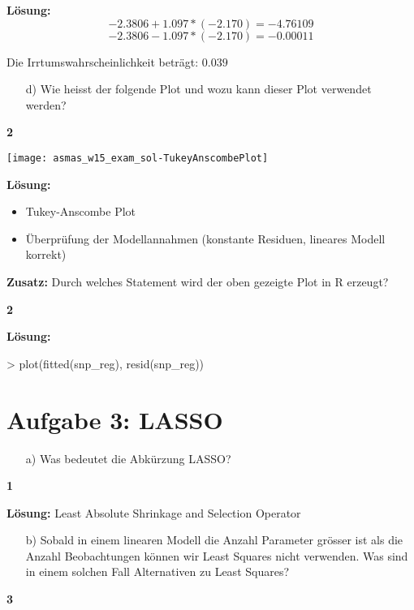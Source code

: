 \documentclass{scrartcl}
\newcommand{\points}[1]
{\begin{flushright}\textbf{#1}\end{flushright}}
\begin{document}
\noindent\textbf{L\"osung:}
$$-2.3806 + 1.097 * (-2.170) = -4.76109$$
$$-2.3806 - 1.097 * (-2.170) = -0.00011$$

Die Irrtumswahrscheinlichkeit betr\"agt: $0.039$

\clearpage
\pagebreak

\begin{enumerate}
\item[d)] Wie heisst der folgende Plot und wozu kann dieser Plot verwendet werden?
\end{enumerate}
\points{2}

\texttt{[image: asmas\_w15\_exam\_sol-TukeyAnscombePlot]}


\noindent\textbf{L\"osung:}
\begin{itemize}
\item Tukey-Anscombe Plot
\item \"Uberpr\"ufung der Modellannahmen (konstante Residuen, lineares Modell korrekt)
\end{itemize}


\clearpage
\pagebreak

\noindent\textbf{Zusatz:} Durch welches Statement wird der oben gezeigte Plot in R erzeugt?

\points{2}

\noindent\textbf{L\"osung:}
\begin{Schunk}
\begin{Sinput}
> plot(fitted(snp_reg), resid(snp_reg))
\end{Sinput}
\end{Schunk}


\clearpage
\pagebreak

\section*{Aufgabe 3: LASSO}

\begin{enumerate}
\item[a)] Was bedeutet die Abk\"urzung LASSO?
\end{enumerate}
\points{1}

\noindent\textbf{L\"osung:} Least Absolute Shrinkage and Selection Operator

\clearpage
\pagebreak

\begin{enumerate}
\item[b)] Sobald in einem linearen Modell die Anzahl Parameter gr\"osser ist als die Anzahl Beobachtungen k\"onnen wir Least Squares nicht verwenden. Was sind in einem solchen Fall Alternativen zu Least Squares?
\end{enumerate}
\points{3}
\end{document}

